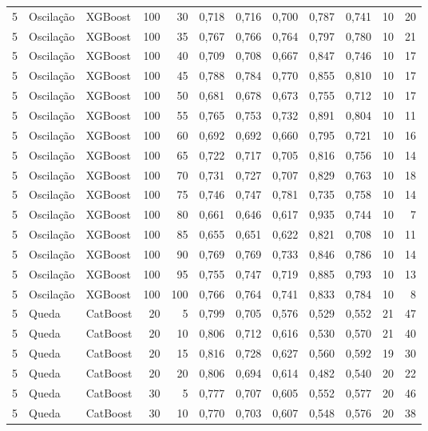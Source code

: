 \begin{longtable}{@{}rllrrrrrrrrr@{}}
5 & Oscilação & XGBoost & 100 & 30 & 0,718 & 0,716 & 0,700 & 0,787 & 0,741 & 10 & 20 \\
5 & Oscilação & XGBoost & 100 & 35 & 0,767 & 0,766 & 0,764 & 0,797 & 0,780 & 10 & 21 \\
5 & Oscilação & XGBoost & 100 & 40 & 0,709 & 0,708 & 0,667 & 0,847 & 0,746 & 10 & 17 \\
5 & Oscilação & XGBoost & 100 & 45 & 0,788 & 0,784 & 0,770 & 0,855 & 0,810 & 10 & 17 \\
5 & Oscilação & XGBoost & 100 & 50 & 0,681 & 0,678 & 0,673 & 0,755 & 0,712 & 10 & 17 \\
5 & Oscilação & XGBoost & 100 & 55 & 0,765 & 0,753 & 0,732 & 0,891 & 0,804 & 10 & 11 \\
5 & Oscilação & XGBoost & 100 & 60 & 0,692 & 0,692 & 0,660 & 0,795 & 0,721 & 10 & 16 \\
5 & Oscilação & XGBoost & 100 & 65 & 0,722 & 0,717 & 0,705 & 0,816 & 0,756 & 10 & 14 \\
5 & Oscilação & XGBoost & 100 & 70 & 0,731 & 0,727 & 0,707 & 0,829 & 0,763 & 10 & 18 \\
5 & Oscilação & XGBoost & 100 & 75 & 0,746 & 0,747 & 0,781 & 0,735 & 0,758 & 10 & 14 \\
5 & Oscilação & XGBoost & 100 & 80 & 0,661 & 0,646 & 0,617 & 0,935 & 0,744 & 10 & 7 \\
5 & Oscilação & XGBoost & 100 & 85 & 0,655 & 0,651 & 0,622 & 0,821 & 0,708 & 10 & 11 \\
5 & Oscilação & XGBoost & 100 & 90 & 0,769 & 0,769 & 0,733 & 0,846 & 0,786 & 10 & 14 \\
5 & Oscilação & XGBoost & 100 & 95 & 0,755 & 0,747 & 0,719 & 0,885 & 0,793 & 10 & 13 \\
5 & Oscilação & XGBoost & 100 & 100 & 0,766 & 0,764 & 0,741 & 0,833 & 0,784 & 10 & 8 \\
5 & Queda & CatBoost & 20 & 5 & 0,799 & 0,705 & 0,576 & 0,529 & 0,552 & 21 & 47 \\
5 & Queda & CatBoost & 20 & 10 & 0,806 & 0,712 & 0,616 & 0,530 & 0,570 & 21 & 40 \\
5 & Queda & CatBoost & 20 & 15 & 0,816 & 0,728 & 0,627 & 0,560 & 0,592 & 19 & 30 \\
5 & Queda & CatBoost & 20 & 20 & 0,806 & 0,694 & 0,614 & 0,482 & 0,540 & 20 & 22 \\
5 & Queda & CatBoost & 30 & 5 & 0,777 & 0,707 & 0,605 & 0,552 & 0,577 & 20 & 46 \\
5 & Queda & CatBoost & 30 & 10 & 0,770 & 0,703 & 0,607 & 0,548 & 0,576 & 20 & 38 \\

\end{longtable}
